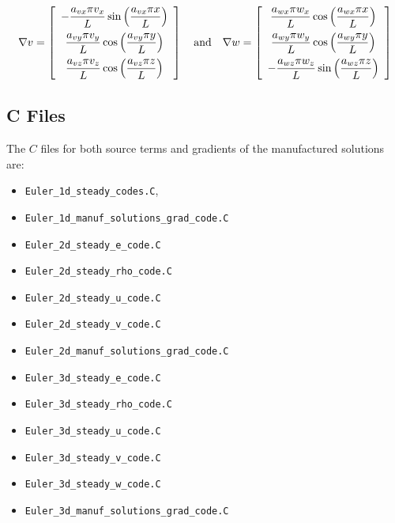 \documentclass[10pt]{article}
\begin{document}
\begin{equation*}
\nabla  v= \left[ \begin{array}{c}
-  \dfrac{  a_{vx}  \pi v_x}{L}  \sin\left( \dfrac{ a_{vx}  \pi  x}{L}\right)\vspace{5pt}\\
    \dfrac{  a_{vy}  \pi v_y}{L} \cos\left( \dfrac{ a_{vy}  \pi  y}{L}\right)\vspace{5pt}\\
   \dfrac{  a_{vz}  \pi v_z }{L} \cos\left( \dfrac{ a_{vz}  \pi  z}{L}\right)
\end{array} \right]
\quad\mbox{and}\quad
\nabla w = \left[ \begin{array}{c}
\dfrac{  a_{wx}  \pi  w_x}{L} \cos\left( \dfrac{ a_{wx}  \pi  x}{L}\right)\vspace{5pt}\\
  \dfrac{  a_{wy}  \pi w_y}{L}  \cos\left( \dfrac{ a_{wy}  \pi  y}{L}\right)\vspace{5pt} \\
 - \dfrac{  a_{wz}  \pi w_z}{L}  \sin\left( \dfrac{ a_{wz}  \pi  z}{L}\right)
\end{array} \right]
\end{equation*}


\subsection{C Files}
The $C$ files for both source terms and gradients of the  manufactured solutions are:
\begin{itemize}
 \item \texttt{Euler\_1d\_steady\_codes.C},
 \item \texttt{Euler\_1d\_manuf\_solutions\_grad\_code.C}
 \item \texttt{Euler\_2d\_steady\_e\_code.C}
 \item \texttt{Euler\_2d\_steady\_rho\_code.C}
 \item \texttt{Euler\_2d\_steady\_u\_code.C}
 \item \texttt{Euler\_2d\_steady\_v\_code.C}
 \item \texttt{Euler\_2d\_manuf\_solutions\_grad\_code.C}
 \item \texttt{Euler\_3d\_steady\_e\_code.C}
 \item \texttt{Euler\_3d\_steady\_rho\_code.C}
 \item \texttt{Euler\_3d\_steady\_u\_code.C}
 \item \texttt{Euler\_3d\_steady\_v\_code.C}
 \item \texttt{Euler\_3d\_steady\_w\_code.C}
 \item \texttt{Euler\_3d\_manuf\_solutions\_grad\_code.C}
\end{itemize}
\end{document}
